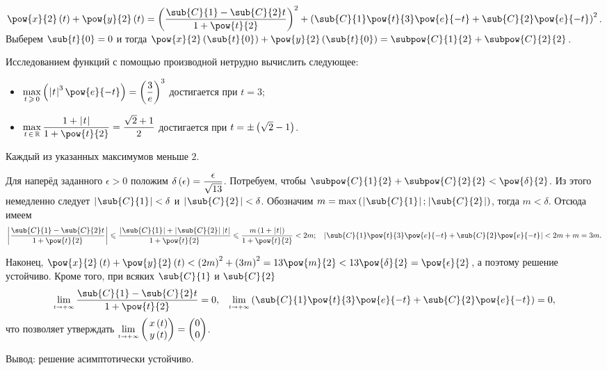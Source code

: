 \documentclass[a5paper,10pt]{article}
\begin{document}
$\pow{x}{2}\br{t} + \pow{y}{2}\br{t} 
    = \br{\dfrac {\sub{C}{1} - \sub{C}{2} t} {1 + \pow{t}{2}}}^2
    + \br{\sub{C}{1} \pow{t}{3} \pow{e}{-t} + \sub{C}{2}\pow{e}{-t}}^2$. \\
Выберем $\sub{t}{0} = 0$ и тогда
$\pow{x}{2}\br{\sub{t}{0}} + \pow{y}{2}\br{\sub{t}{0}} = \subpow{C}{1}{2} + \subpow{C}{2}{2}$.

Исследованием функций с помощью производной нетрудно вычислить следующее:
\begin{itemize}
    \item $\tmax{t\, \ge\, 0} \br{\vbr{t}^3 \pow{e}{-t}} = \br{\dfrac {3} {e}}^3$
        достигается при $t = 3$;
    \item $\tmax{t\, \in \,{\mathbb{R}}} \dfrac {1 + \vbr{t}} {1 + \pow{t}{2}}
        = \dfrac {\sqrt{2} + 1} {2}$
        достигается при $t = \pm \left(\hspace{0.01em}\sqrt{2} - 1\hspace{0.01em}\right)$. \vspace{0.5em}
\end{itemize} 
Каждый из указанных максимумов меньше $2$.

Для наперёд заданного $\epsilon > 0$ положим 
$\delta\left(\hspace{0.01em}\epsilon\hspace{0.01em}\right) = \dfrac {\epsilon} {\sqrt{13}}$. 
Потребуем, чтобы $\subpow{C}{1}{2} + \subpow{C}{2}{2} < \pow{\delta}{2}$.
Из этого немедленно следует $\vbr{\sub{C}{1}} < \delta$ и $\vbr{\sub{C}{2}} < \delta$.
Обозначим $m = \max\br{\vbr{\sub{C}{1}}; \vbr{\sub{C}{2}}}$, тогда $m < \delta$.
Отсюда имеем \vspace{0.5em}
\begin{align*}
    \vbr{\dfrac {\sub{C}{1} - \sub{C}{2} t} {1 + \pow{t}{2}}}
        \le \dfrac {\vbr{\sub{C}{1}} + \vbr{\sub{C}{2}} \vbr{t}} {1 + \pow{t}{2}}
        \le \dfrac {m \br{1 + \vbr{t}}} {1 + \pow{t}{2}} < 2m;
    && \vbr{\sub{C}{1} \pow{t}{3} \pow{e}{-t} + \sub{C}{2}\pow{e}{-t}} < 2m + m = 3m.
\end{align*}

Наконец, 
$\pow{x}{2}\br{t} + \pow{y}{2}\br{t} 
    < \br{2m}^2 + \br{3m}^2 
    = 13\pow{m}{2} 
    < 13\pow{\delta}{2} 
    = \pow{\epsilon}{2}$,
а поэтому решение устойчиво. Кроме того, при всяких $\sub{C}{1}$ и $\sub{C}{2}$
\vspace{\lineskip}
\begin{align*}
    \tlim{\mathsmaller{t \to +\infty}} \dfrac {\sub{C}{1} - \sub{C}{2} t} {1 + \pow{t}{2}} = 0,
    && \tlim{\mathsmaller{t \to +\infty}} \br{\sub{C}{1} \pow{t}{3} \pow{e}{-t} 
        + \sub{C}{2}\pow{e}{-t}} = 0,
\end{align*}
что позволяет утверждать 
$\tlim{\mathsmaller{t \to +\infty}} \begin{pmatrix} \,x\br{t} \\ \,y\br{t}\end{pmatrix}
= \begin{pmatrix} 0 \\ 0 \end{pmatrix}$.

Вывод: решение асимптотически устойчиво.
\end{document}
